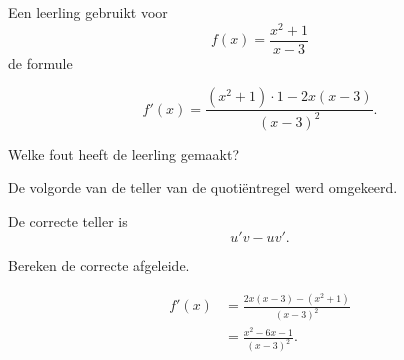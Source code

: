 \documentclass{ximera}
\begin{document}
\begin{oefening}{\oefB\ESS}

Een leerling gebruikt voor
\[
f(x)=\frac{x^2+1}{x-3}
\]
de formule

\[
f'(x)=
\frac{
(x^2+1)\cdot1-2x(x-3)
}{
(x-3)^2
}.
\]

\begin{question}
Welke fout heeft de leerling gemaakt?

\begin{oplossing}
De volgorde van de teller van de quotiëntregel werd omgekeerd.

De correcte teller is
\[
u'v-uv'.
\]
\end{oplossing}
\end{question}

\begin{question}
Bereken de correcte afgeleide.

\begin{oplossing}
\[
\begin{aligned}
f'(x)
&=
\frac{
2x(x-3)-(x^2+1)
}{
(x-3)^2
}\\
&=
\boxed{
\frac{x^2-6x-1}{(x-3)^2}
}.
\end{aligned}
\]
\end{oplossing}
\end{question}

\end{oefening}


\end{document}
